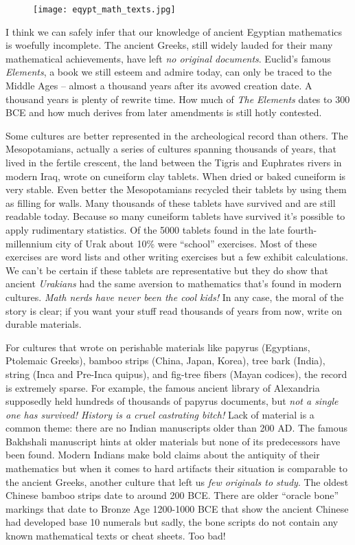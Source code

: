  \captionsetup[figure]{labelformat=empty}
\begin{figure}[htbp]
 \centering
\texttt{[image: eqypt\_math\_texts.jpg]}
\label{fig:7765x1}
\end{figure}


I think we can safely infer that our knowledge of ancient Egyptian
mathematics is woefully incomplete. The ancient Greeks, still widely
lauded for their many mathematical achievements, have left \emph{no
original documents}. Euclid's famous \emph{Elements}, a book we still
esteem and admire today, can only be traced to the Middle Ages -- almost
a thousand years after its avowed creation date. A thousand years is
plenty of rewrite time. How much of \emph{The Elements} dates to 300 BCE
and how much derives from later amendments is still hotly contested.

Some cultures are better represented in the archeological record than
others. The Mesopotamians, actually a series of cultures spanning
thousands of years, that lived in the fertile crescent, the land between
the Tigris and Euphrates rivers in modern Iraq, wrote on cuneiform clay
tablets. When dried or baked cuneiform is very stable. Even better the
Mesopotamians recycled their tablets by using them as filling for walls.
Many thousands of these tablets have survived and are still readable
today. Because so many cuneiform tablets have survived it's possible to
apply rudimentary statistics. Of the 5000 tablets found in the late
fourth-millennium city of Urak about 10\% were ``school'' exercises.
Most of these exercises are word lists and other writing exercises but a
few exhibit calculations. We can't be certain if these tablets are
representative but they do show that ancient \emph{Urakians} had the
same aversion to mathematics that's found in modern cultures. \emph{Math
nerds have never been the cool kids!} In any case, the moral of the
story is clear; if you want your stuff read thousands of years from now,
write on durable materials.

For cultures that wrote on perishable materials like papyrus (Egyptians,
Ptolemaic Greeks), bamboo strips (China, Japan, Korea), tree bark
(India), string (Inca and Pre-Inca quipus), and fig-tree fibers (Mayan
codices), the record is extremely sparse. For example, the famous
ancient library of Alexandria supposedly held hundreds of thousands of
papyrus documents, but \emph{not a single one has survived! History is a
cruel castrating bitch!} Lack of material is a common theme: there are
no Indian manuscripts older than 200 AD. The famous Bakhshali manuscript
hints at older materials but none of its predecessors have been found.
Modern Indians make bold claims about the antiquity of their mathematics
but when it comes to hard artifacts their situation is comparable to the
ancient Greeks, another culture that left us \emph{few originals to
study}. The oldest Chinese bamboo strips date to around 200 BCE. There
are older ``oracle bone'' markings that date to Bronze Age 1200-1000 BCE
that show the ancient Chinese had developed base 10 numerals but sadly,
the bone scripts do not contain any known mathematical texts or cheat
sheets. Too bad!

